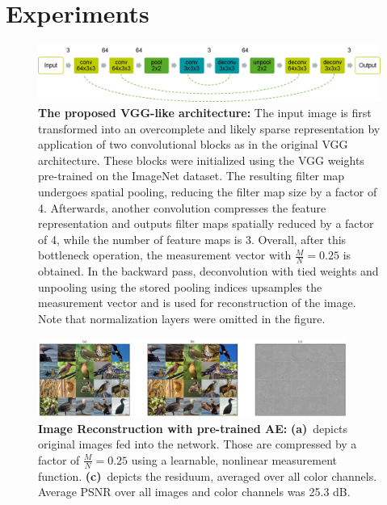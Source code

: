 \documentclass[10pt,twocolumn,a4paper]{article}
\newcommand{\la}{\textbf{(a)}~}
\newcommand{\lc}{\textbf{(c)}~}
\begin{document}
\section{Experiments}

\begin{figure}
\begin{center}
\includegraphics[width=\textwidth]{fig/vgg-architecture}
\end{center}
   \caption{
       \textbf{The proposed VGG-like architecture:}
       The input image is first transformed into an overcomplete and likely sparse representation by application of two convolutional blocks as in the original VGG architecture.
       These blocks were initialized using the VGG weights pre-trained on the ImageNet dataset.
       The resulting filter map undergoes spatial pooling, reducing the filter map size by a factor of 4.
       Afterwards, another convolution compresses the feature representation and outputs filter maps spatially reduced by a factor of 4, while the number of feature maps is 3.
       Overall, after this bottleneck operation, the measurement vector with $\frac{M}{N} = 0.25$ is obtained.
       In the backward pass, deconvolution with tied weights and unpooling using the stored pooling indices upsamples the measurement vector and is used for reconstruction of the image.
       Note that normalization layers were omitted in the figure.
   }
\label{fig:network-structure}
\end{figure}

\begin{figure}
\begin{center}
\includegraphics[width=0.9\textwidth]{fig/vgg-ae-rgb-2}
\end{center}
   \caption{
       \textbf{Image Reconstruction with pre-trained AE:}
       \la depicts original images fed into the network.
       Those are compressed by a factor of $\frac{M}{N} = 0.25$ using a learnable, nonlinear measurement function.
       \lc depicts the residuum, averaged over all color channels.
       Average PSNR over all images and color channels was 25.3 dB.
   }
\label{fig:reconstruction}
\end{figure}
\end{document}
